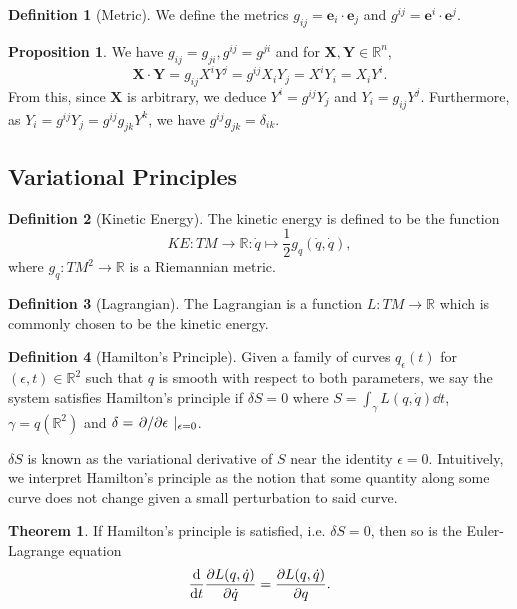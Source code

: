 \documentclass[]{article}
\theoremstyle{definition}
\newtheorem{theorem}{Theorem}
\theoremstyle{definition}
\newtheorem{definition}{Definition}[section]
\newtheorem{proposition}{Proposition}[section]
\begin{document}
\begin{definition}[Metric]
  We define the metrics \(g_{ij} = \mathbf{e}_i \cdot \mathbf{e}_j\) and 
  \(g^{ij} = \mathbf{e}^i \cdot \mathbf{e}^j\).
\end{definition}

\begin{proposition}
  We have \(g_{ij} = g_{ji}, g^{ij} = g^{ji}\) and for 
  \(\mathbf{X}, \mathbf{Y} \in \mathbb{R}^n\), 
  \[\mathbf{X} \cdot \mathbf{Y} = g_{ij} X^i Y^j = g^{ij}X_i Y_j = X^i Y_i = X_i Y^i.\]
  From this, since \(\mathbf{X}\) is arbitrary, we deduce \(Y^i = g^{ij} Y_j\) 
  and \(Y_i = g_{ij} Y^j\). Furthermore, as \(Y_i = g^{ij}Y_j = g^{ij}g_{jk}Y^k\), 
  we have \(g^{ij}g_{jk} = \delta_{ik}\).
\end{proposition}

\subsection*{Variational Principles}

\begin{definition}[Kinetic Energy]
  The kinetic energy is defined to be the function 
  \[KE : TM \to \mathbb{R} : \dot q \mapsto \frac{1}{2}g_q(\dot q, \dot q),\]
  where \(g_q : TM^2 \to \mathbb{R}\) is a Riemannian metric.
\end{definition}

\begin{definition}[Lagrangian]
  The Lagrangian is a function \(L : TM \to \mathbb{R}\) which is commonly 
  chosen to be the kinetic energy.
\end{definition}

\begin{definition}[Hamilton's Principle]
  Given a family of curves \(q_\epsilon(t)\) for \((\epsilon, t) \in \mathbb{R}^2\) 
  such that \(q\) is smooth with respect to both parameters, we say the system 
  satisfies Hamilton's principle if \(\delta S = 0\) where 
  \(S = \int_\gamma L(q, \dot q) \dd t\), \(\gamma = q(\mathbb{R}^2)\) and 
  \(\delta = \pdv*{\epsilon}\mid_{\epsilon = 0}\).
\end{definition}

\(\delta S\) is known as the variational derivative of \(S\) near the identity 
\(\epsilon = 0\). Intuitively, we interpret Hamilton's principle as the 
notion that some quantity along some curve does not change given a small 
perturbation to said curve.

\begin{theorem}
  If Hamilton's principle is satisfied, i.e. \(\delta S = 0\), then so is 
  the Euler-Lagrange equation 
  \[\dv{t}\pdv{L(q, \dot q)}{\dot q} = \pdv{L(q, \dot q)}{q}.\]
\end{theorem}
\end{document}

